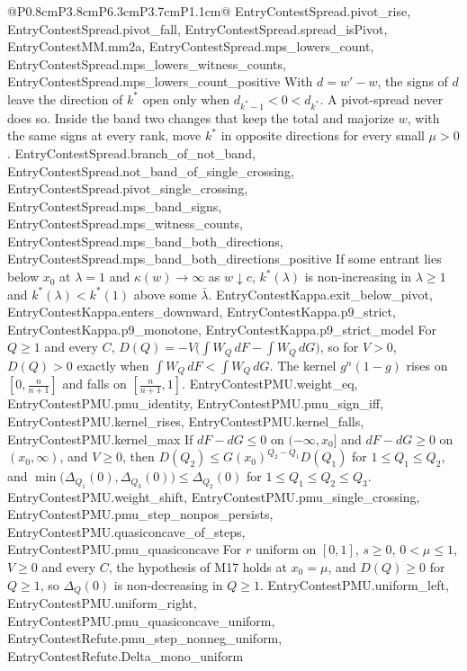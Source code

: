 \begin{longtable}{@{}P{0.8cm}P{3.8cm}P{6.3cm}P{3.7cm}P{1.1cm}@{}}
  {EntryContestSpread.pivot_rise, EntryContestSpread.pivot_fall, EntryContestSpread.spread_isPivot, EntryContestMM.mm2a, EntryContestSpread.mps_lowers_count, EntryContestSpread.mps_lowers_witness_counts, EntryContestSpread.mps_lowers_count_positive}
  {With $d=w'-w$, the signs of $d$ leave the direction of $k^*$ open only when
  $d_{k^*-1}<0<d_{k^*}$. A pivot-spread never does so. Inside the band two
  changes that keep the total and majorize $w$, with the same signs at every
  rank, move $k^*$ in opposite directions for every small $\mu>0$.}
  {EntryContestSpread.branch_of_not_band, EntryContestSpread.not_band_of_single_crossing, EntryContestSpread.pivot_single_crossing, EntryContestSpread.mps_band_signs, EntryContestSpread.mps_witness_counts, EntryContestSpread.mps_band_both_directions, EntryContestSpread.mps_band_both_directions_positive}
  {If some entrant lies below $x_0$ at $\lambda=1$ and $\kappa(w)\to\infty$ as
  $w\downarrow c$, $k^*(\lambda)$ is non-increasing in $\lambda\ge1$ and
  $k^*(\lambda)<k^*(1)$ above some $\bar\lambda$.}
  {EntryContestKappa.exit_below_pivot, EntryContestKappa.enters_downward, EntryContestKappa.p9_strict, EntryContestKappa.p9_monotone, EntryContestKappa.p9_strict_model}
  {For $Q\ge1$ and every $C$, $D(Q)=-V\big(\int W_Q\,dF-\int W_Q\,dG\big)$, so for
  $V>0$, $D(Q)>0$ exactly when $\int W_Q\,dF<\int W_Q\,dG$. The kernel
  $g^n(1-g)$ rises on $[0,\frac n{n+1}]$ and falls on $[\frac n{n+1},1]$.}
  {EntryContestPMU.weight_eq, EntryContestPMU.pmu_identity, EntryContestPMU.pmu_sign_iff, EntryContestPMU.kernel_rises, EntryContestPMU.kernel_falls, EntryContestPMU.kernel_max}
  {If $dF-dG\le0$ on $(-\infty,x_0]$ and $dF-dG\ge0$ on $(x_0,\infty)$, and
  $V\ge0$, then $D(Q_2)\le G(x_0)^{Q_2-Q_1}D(Q_1)$ for $1\le Q_1\le Q_2$, and
  $\min\big(\Delta_{Q_1}(0),\Delta_{Q_3}(0)\big)\le\Delta_{Q_2}(0)$ for
  $1\le Q_1\le Q_2\le Q_3$.}
  {EntryContestPMU.weight_shift, EntryContestPMU.pmu_single_crossing, EntryContestPMU.pmu_step_nonpos_persists, EntryContestPMU.quasiconcave_of_steps, EntryContestPMU.pmu_quasiconcave}
  {For $r$ uniform on $[0,1]$, $s\ge0$, $0<\mu\le1$, $V\ge0$ and every $C$, the
  hypothesis of M17 holds at $x_0=\mu$, and $D(Q)\ge0$ for $Q\ge1$, so
  $\Delta_Q(0)$ is non-decreasing in $Q\ge1$.}
  {EntryContestPMU.uniform_left, EntryContestPMU.uniform_right, EntryContestPMU.pmu_quasiconcave_uniform, EntryContestRefute.pmu_step_nonneg_uniform, EntryContestRefute.Delta_mono_uniform}

\end{longtable}
